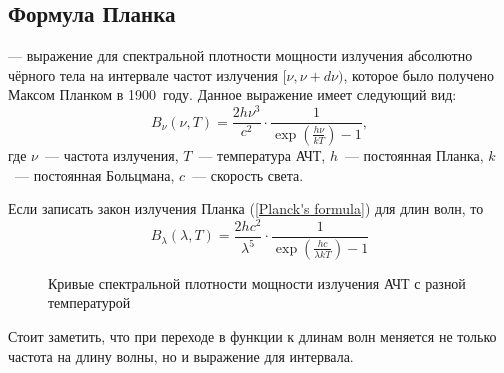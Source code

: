 \subsection{Формула Планка}
\label{sec:planck-law}
 --- выражение для спектральной плотности мощности излучения абсолютно чёрного тела на интервале частот излучения  $[\nu, \nu + d \nu)$, которое было получено Максом Планком в 1900~году. Данное выражение имеет следующий вид:
\begin{equation}\label{Planck's formula}
B_\nu(\nu,T)=\frac{2h\nu^3}{c^2}\cdot \frac{1}{\exp\left(\frac{h\nu}{kT}\right)-1},
\end{equation}
где $\nu$~--- частота излучения, $T$~--- температура АЧТ, $h$~--- постоянная Планка, $k$~--- постоянная Больцмана, $c$~--- скорость света.

Если записать закон излучения Планка (\ref{Planck's formula}) для длин волн, то
\begin{equation}\label{Planck's formula2}
B_\lambda(\lambda,T)=\frac{2hc^2}{\lambda^5} \cdot \frac{1}{\exp\left(\frac{hc}{\lambda kT}\right)-1}
\end{equation}
\begin{wrapfigure}[15]{l}{.6\tw}
\centering
\vspace{-.9pc}
\caption{Кривые спектральной плотности мощности излучения АЧТ с разной температурой}\label{pic:wien-law}
\end{wrapfigure}
Стоит заметить, что при переходе в функции к длинам волн меняется не только частота на длину волны, но и выражение для интервала. 

